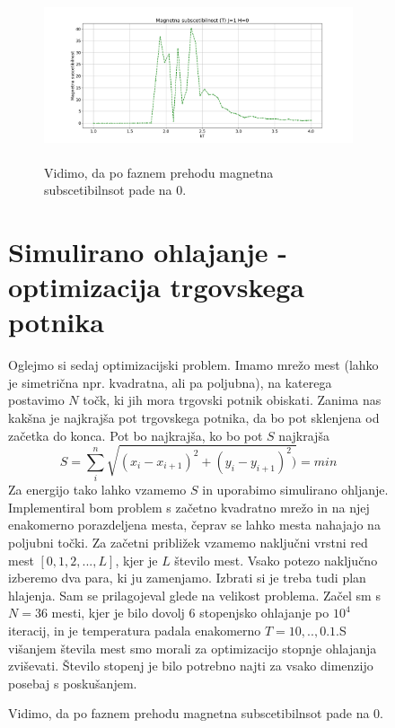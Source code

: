 \documentclass[11pt, a4paper]{article}
\begin{document}
\begin{figure}[H]
\begin{figure}[H]
\end{figure}  
 \begin{figure}[H]
\centering
  \includegraphics[width=17cm, height=5cm]{subscetiblnost.png}
\caption{Vidimo, da po faznem prehodu magnetna subscetibilnsot pade na 0.}

\end{figure} 

\section{Simulirano ohlajanje - optimizacija trgovskega potnika}
Oglejmo si sedaj optimizacijski problem. Imamo mrežo mest (lahko je simetrična npr. kvadratna, ali pa poljubna), na katerega postavimo $N$ točk, ki jih mora trgovski potnik obiskati. Zanima nas kakšna je najkrajša pot trgovskega potnika, da bo pot sklenjena od začetka do konca. Pot bo najkrajša, ko bo pot $S$ najkrajša 
\begin{equation}
S = \sum_i^n \sqrt{(x_i -x_{i+1})^2 + (y_i -y_{i+1})^2)} = min
\end{equation}
Za energijo tako lahko vzamemo $S$ in uporabimo simulirano ohljanje. Implementiral bom problem s začetno kvadratno mrežo in na njej enakomerno porazdeljena mesta, čeprav se lahko mesta nahajajo na poljubni točki. Za začetni približek vzamemo naključni vrstni red mest $[0,1,2,...,L]$, kjer je $L$ število mest.\newline\newline
Vsako potezo naključno izberemo dva para, ki ju zamenjamo. Izbrati si je treba tudi plan hlajenja. Sam se prilagojeval glede na velikost problema. 
Začel sm s $N =36$ mesti, kjer je bilo dovolj 6 stopenjsko ohlajanje po $10^4$ iteracij, in je temperatura padala enakomerno $T = 10,..,0.1$.\newline\newline S višanjem števila mest smo morali za optimizacijo stopnje ohlajanja zviševati. Število stopenj je bilo potrebno najti za vsako dimenzijo posebaj s poskušanjem.
  

\end{figure}
\end{document}
